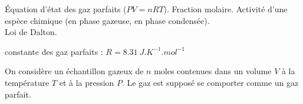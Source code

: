 \begin{prerequis}
	Équation d'état des gaz parfaits ($PV=nRT$). 
	Fraction molaire.
	Activité d'une espèce chimique (en phase gazeuse, en phase condensée). \\
	Loi de Dalton.
	
\constantesUtiles
	\begin{listeConstantes}
		\item constante des gaz parfaits : $R=\SI{8,31}{J.K^{-1}.mol^{-1}}$
	\end{listeConstantes}
\end{prerequis}













\hauteurLargeurCadreReponse		{8mm}{3cm}
\initialisationEntrainement

On considère un échantillon gazeux de $n$ moles contenues dans un volume $V$ à la température $T$ et à la pression $P$. Le gaz est supposé se comporter comme un gaz parfait. \minusMedskip

